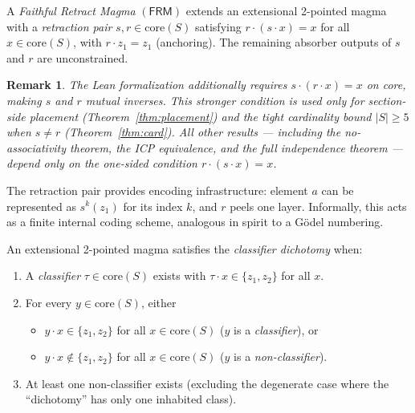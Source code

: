 \documentclass[sigconf,screen,review,anonymous]{acmart}
\newtheorem{remark}{Remark}
\newcommand{\dotop}{\cdot}
\newcommand{\FRM}{\textsf{FRM}}
\newcommand{\core}{\mathrm{core}}
\begin{document}
\begin{definition}
\label{def:frm}
A \emph{Faithful Retract Magma} $(\FRM)$ extends an extensional 2-pointed magma with a \emph{retraction pair} $s, r \in \core(S)$ satisfying $r \dotop (s \dotop x) = x$ for all $x \in \core(S)$, with $r \dotop z_1 = z_1$ (anchoring). The remaining absorber outputs of $s$ and $r$ are unconstrained.
\end{definition}

\begin{remark}
The Lean formalization additionally requires $s \dotop (r \dotop x) = x$ on core, making $s$ and $r$ mutual inverses. This stronger condition is used only for section-side placement (Theorem~\ref{thm:placement}) and the tight cardinality bound $|S| \geq 5$ when $s \neq r$ (Theorem~\ref{thm:card}). All other results --- including the no-associativity theorem, the ICP equivalence, and the full independence theorem --- depend only on the one-sided condition $r \dotop (s \dotop x) = x$.
\end{remark}

The retraction pair provides encoding infrastructure: element $a$ can be represented as $s^k(z_1)$ for its index $k$, and $r$ peels one layer. Informally, this acts as a finite internal coding scheme, analogous in spirit to a G\"odel numbering.

\begin{definition}
\label{def:cd}
An extensional 2-pointed magma satisfies the \emph{classifier dichotomy} when:
\begin{enumerate}
  \item A \emph{classifier} $\tau \in \core(S)$ exists with $\tau \dotop x \in \{z_1, z_2\}$ for all $x$.
  \item For every $y \in \core(S)$, either
    \begin{itemize}
      \item $y \dotop x \in \{z_1, z_2\}$ for all $x \in \core(S)$ \quad ($y$ is a \emph{classifier}), or
      \item $y \dotop x \notin \{z_1, z_2\}$ for all $x \in \core(S)$ \quad ($y$ is a \emph{non-classifier}).
    \end{itemize}
  \item At least one non-classifier exists (excluding the degenerate case where the ``dichotomy'' has only one inhabited class).
\end{enumerate}
\end{definition}
\end{document}
